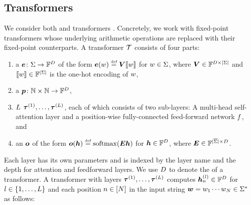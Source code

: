 \subsection{Transformers} \label{app:transformers}

We consider both  \citep{devlin-etal-2019-bert} and  transformers \citep{radford2019language}.
Concretely, we work with fixed-point transformers whose underlying arithmetic operations are replaced with their fixed-point counterparts.
A transformer ${{\mathcal{T}}}$ consists of four parts: 
\begin{enumerate}[label=(\arabic*),topsep=0pt,noitemsep]
   \item a  ${\bm{e}}\colon {{\Sigma}} \to {{\mathbb{F}}}^{{{D}}}$ of the form ${\bm{e}}({{w}}) \mathrel{\stackrel{\textnormal{\tiny def}}{=}} {{{{{\bm{V}}}}}} {{\llbracket{{w}}\rrbracket}}$ for ${{w}} \in{{\Sigma}}$, where ${{{{{\bm{V}}}}}} \in {{\mathbb{F}}}^{{{D}} \times {{|{{\Sigma}}|}}}$ and ${{\llbracket{{w}}\rrbracket}} \in {{\mathbb{F}}}^{{{|{{\Sigma}}|}}}$ is the one-hot encoding of ${{w}}$,
   \item a  ${\bm{p}}\colon {{\mathbb{N}}} \times {{\mathbb{N}}} \to {{\mathbb{F}}}^{{D}}$,
   \item ${{L}}$  ${{\boldsymbol{\tau}}}^{(1)}, \ldots, {{\boldsymbol{\tau}}}^{({{L}})}$, each of which consists of two sub-layers: A multi-head self-attention layer and a position-wise fully-connected feed-forward network ${{{f}}}$, and
   \item an  ${\bm{o}}$ of the form ${\bm{o}}({{{{{\bm{h}}}}}}) \mathrel{\stackrel{\textnormal{\tiny def}}{=}} {{\mathrm{softmax}}}({{{{{\bm{E}}}}}} {{{{{\bm{h}}}}}})$ for ${{{{{\bm{h}}}}}}\in{{\mathbb{F}}}^{{{D}}}$, where ${{{{{\bm{E}}}}}} \in {{\mathbb{F}}}^{{{|{{\overline{{{\Sigma}}}}}|}} \times {{D}}}$.
\end{enumerate}
Each layer has its own parameters and is indexed by the layer name and the depth for attention and feedforward layers.
We use ${{D}}$ to denote the  of a transformer.
A transformer with layers ${{\boldsymbol{\tau}}}^{(1)}, \ldots, {{\boldsymbol{\tau}}}^{({{L}})}$ computes ${{{{{\bm{h}}}}}}^{({{l}})}_{{n}} \in {{\mathbb{F}}}^{{{D}}}$ for ${{l}} \in {\left\{ 1, \ldots, {{L}}\right\}}$ and each position ${{n}} \in {\left[ {{N}}\right]}$ in the input string ${{\boldsymbol{w}}} = {{w}}_1\cdots{{w}}_{{N}} \in {{{{{{\Sigma}}^{*}}}}}$ as follows:

